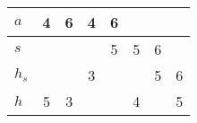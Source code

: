 \begin{exercise}
\begin{minipage}{0.63\textwidth}
      \begin{tabular}{|l|c|c|c|c|c|c|c|}
        \hline
        $a$     & 4 & 6 & 4 & 6 &   &   &   \\
        \hline
        $s$     &   &   &   & 5 & 5 & 6 &   \\
        \hline
        $h_{s}$ &   &   & 3 &   &   & 5 & 6 \\
        \hline
        $h$     & 5 & 3 &   &   & 4 &   & 5 \\
        \hline
      \end{tabular}
    \end{minipage}
  \fi
\end{exercise}
